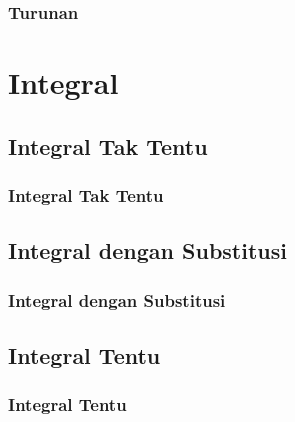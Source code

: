 \documentclass[pdflatex,compress,mathserif]{beamer}
\begin{document}
	\begin{frame}
		\frametitle{Turunan}
	\end{frame}

\section{Integral}
	
	\subsection{Integral Tak Tentu}
		
		\begin{frame}
			\frametitle{Integral Tak Tentu}
		\end{frame}
	
	\subsection{Integral dengan Substitusi}
	
		\begin{frame}
			\frametitle{Integral dengan Substitusi}
		\end{frame}
	
	\subsection{Integral Tentu}
	
		\begin{frame}
			\frametitle{Integral Tentu}
		\end{frame}
\end{document}
